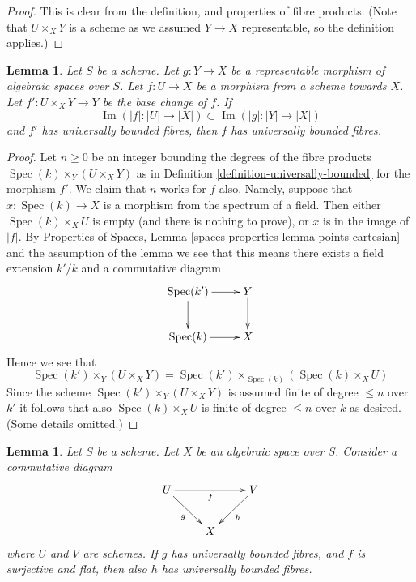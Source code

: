\documentclass{stacks-project}
\theoremstyle{plain}
\newtheorem{lemma}[subsection]{Lemma}
\theoremstyle{definition}
\theoremstyle{remark}
\numberwithin{equation}{subsection}
\def\Spec{\mathop{\mathrm{Spec}}}
\def\Im{\mathop{\mathrm{Im}}}
\begin{document}
\begin{proof}
This is clear from the definition, and properties of fibre products.
(Note that $U \times_X Y$ is a scheme
as we assumed $Y \to X$ representable, so the definition applies.)
\end{proof}

\begin{lemma}
\label{lemma-descent-universally-bounded}
Let $S$ be a scheme. Let $g : Y \to X$ be a representable morphism of
algebraic spaces over $S$. Let $f : U \to X$ be a morphism from a scheme
towards $X$. Let $f' : U \times_X Y \to Y$ be the base change of $f$.
If
$$
\Im(|f| : |U| \to |X|) \subset \Im(|g| : |Y| \to |X|)
$$
and $f'$ has universally bounded fibres, then $f$ has universally
bounded fibres.
\end{lemma}

\begin{proof}
Let $n \geq 0$ be an integer bounding the degrees of the fibre
products $\Spec(k) \times_Y (U \times_X Y)$ as in
Definition \ref{definition-universally-bounded} for the morphism $f'$.
We claim that $n$ works for $f$ also. Namely, suppose that
$x : \Spec(k) \to X$ is a morphism from the spectrum of
a field. Then either $\Spec(k) \times_X U$ is empty (and there
is nothing to prove), or $x$ is in the image of $|f|$. By
Properties of Spaces,
Lemma \ref{spaces-properties-lemma-points-cartesian}
and the assumption of the lemma we see
that this means there exists a field extension $k'/k$ and a
commutative diagram
$$
\xymatrix{
\Spec(k') \ar[r] \ar[d] & Y \ar[d] \\
\Spec(k) \ar[r] & X
}
$$
Hence we see that
$$
\Spec(k') \times_Y (U \times_X Y) =
\Spec(k') \times_{\Spec(k)} (\Spec(k) \times_X U)
$$
Since the scheme $\Spec(k') \times_Y (U \times_X Y)$ is assumed finite
of degree $\leq n$ over $k'$ it follows that also $\Spec(k) \times_X U$
is finite of degree $\leq n$ over $k$ as desired. (Some details omitted.)
\end{proof}

\begin{lemma}
\label{lemma-universally-bounded-permanence}
Let $S$ be a scheme. Let $X$ be an algebraic space over $S$.
Consider a commutative diagram
$$
\xymatrix{
U \ar[rd]_g \ar[rr]_f & & V \ar[ld]^h \\
& X &
}
$$
where $U$ and $V$ are schemes. If $g$ has universally bounded fibres,
and $f$ is surjective and flat, then also $h$ has universally bounded fibres.
\end{lemma}
\end{document}

